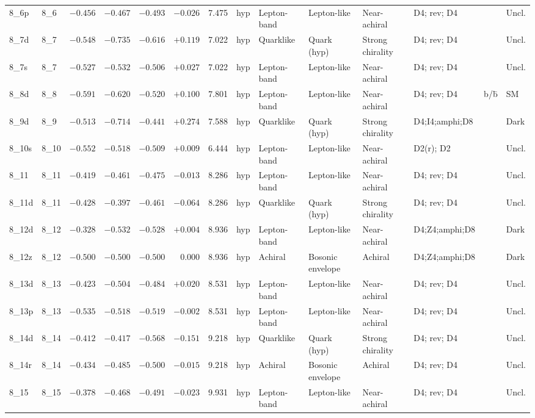 \begin{landscape}
\begin{longtable}{@{}llrrrrrllp{3.2cm}lp{2.8cm}@{}}
8\_6p & 8\_6 & $-0.456$ & $-0.467$ & $-0.493$ & $-0.026$ & 7.475 & hyp & Lepton-band & Lepton-like & Near-achiral & D4; rev; D4 & & Uncl. \\
8\_7d & 8\_7 & $-0.548$ & $-0.735$ & $-0.616$ & $+0.119$ & 7.022 & hyp & Quarklike & Quark (hyp) & Strong chirality & D4; rev; D4 & & Uncl. \\
8\_7s & 8\_7 & $-0.527$ & $-0.532$ & $-0.506$ & $+0.027$ & 7.022 & hyp & Lepton-band & Lepton-like & Near-achiral & D4; rev; D4 & & Uncl. \\
8\_8d & 8\_8 & $-0.591$ & $-0.620$ & $-0.520$ & $+0.100$ & 7.801 & hyp & Lepton-band & Lepton-like & Near-achiral & D4; rev; D4 & b/b̄ & SM \\
8\_9d & 8\_9 & $-0.513$ & $-0.714$ & $-0.441$ & $+0.274$ & 7.588 & hyp & Quarklike & Quark (hyp) & Strong chirality & D4;I4;amphi;D8 & & Dark \\
8\_10s & 8\_10 & $-0.552$ & $-0.518$ & $-0.509$ & $+0.009$ & 6.444 & hyp & Lepton-band & Lepton-like & Near-achiral & D2(r); D2 & & Uncl. \\
8\_11 & 8\_11 & $-0.419$ & $-0.461$ & $-0.475$ & $-0.013$ & 8.286 & hyp & Lepton-band & Lepton-like & Near-achiral & D4; rev; D4 & & Uncl. \\
8\_11d & 8\_11 & $-0.428$ & $-0.397$ & $-0.461$ & $-0.064$ & 8.286 & hyp & Quarklike & Quark (hyp) & Strong chirality & D4; rev; D4 & & Uncl. \\
8\_12d & 8\_12 & $-0.328$ & $-0.532$ & $-0.528$ & $+0.004$ & 8.936 & hyp & Lepton-band & Lepton-like & Near-achiral & D4;Z4;amphi;D8 & & Dark \\
8\_12z & 8\_12 & $-0.500$ & $-0.500$ & $-0.500$ & 0.000 & 8.936 & hyp & Achiral & Bosonic envelope & Achiral & D4;Z4;amphi;D8 & & Dark \\
8\_13d & 8\_13 & $-0.423$ & $-0.504$ & $-0.484$ & $+0.020$ & 8.531 & hyp & Lepton-band & Lepton-like & Near-achiral & D4; rev; D4 & & Uncl. \\
8\_13p & 8\_13 & $-0.535$ & $-0.518$ & $-0.519$ & $-0.002$ & 8.531 & hyp & Lepton-band & Lepton-like & Near-achiral & D4; rev; D4 & & Uncl. \\
8\_14d & 8\_14 & $-0.412$ & $-0.417$ & $-0.568$ & $-0.151$ & 9.218 & hyp & Quarklike & Quark (hyp) & Strong chirality & D4; rev; D4 & & Uncl. \\
8\_14r & 8\_14 & $-0.434$ & $-0.485$ & $-0.500$ & $-0.015$ & 9.218 & hyp & Achiral & Bosonic envelope & Achiral & D4; rev; D4 & & Uncl. \\
8\_15 & 8\_15 & $-0.378$ & $-0.468$ & $-0.491$ & $-0.023$ & 9.931 & hyp & Lepton-band & Lepton-like & Near-achiral & D4; rev; D4 & & Uncl. \\

\end{longtable}
\end{landscape}
